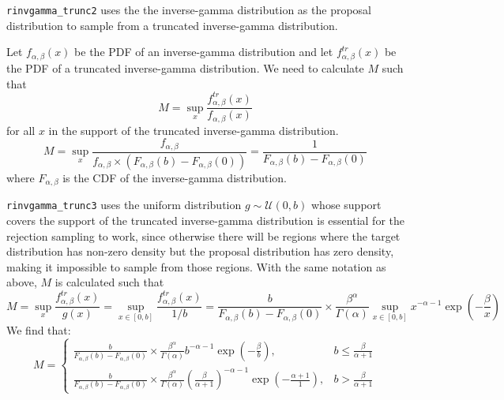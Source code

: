 \begin{answerenum}
    \item \texttt{rinvgamma\_trunc2} uses the the inverse-gamma distribution as the proposal distribution to sample from a truncated inverse-gamma distribution.

    Let \(f_{\alpha, \beta}(x)\) be the PDF of an inverse-gamma distribution and let \(f_{\alpha, \beta}^{tr}(x)\) be the PDF of a truncated inverse-gamma distribution.
    We need to calculate \(M\) such that
    \[ M = \sup_{x} \frac{f_{\alpha, \beta}^{tr}(x)}{f_{\alpha, \beta}(x)}\]
    for all \(x\) in the support of the truncated inverse-gamma distribution.
    \[ M = \sup_x \frac{f_{\alpha, \beta}}{f_{\alpha, \beta} \times (F_{\alpha, \beta}(b) - F_{\alpha, \beta}(0))} = \frac{1}{F_{\alpha, \beta}(b) - F_{\alpha, \beta}(0)} \]
    where \(F_{\alpha, \beta}\) is the CDF of the inverse-gamma distribution.

    \item \texttt{rinvgamma\_trunc3} uses the uniform distribution \(g \sim \mathcal{U}(0, b)\) whose support covers the support of the truncated inverse-gamma distribution is essential for the rejection sampling to work, since otherwise there will be regions where the target distribution has non-zero density but the proposal distribution has zero density, making it impossible to sample from those regions.
    With the same notation as above, \(M\) is calculated such that
    \[ M = \sup_{x} \frac{f_{\alpha, \beta}^{tr}(x)}{g(x)} = \sup_{x \in [0,b]} \frac{f_{\alpha, \beta}^{tr}(x)}{1/b} = \frac{b}{F_{\alpha, \beta}(b) - F_{\alpha, \beta}(0)} \times \frac{\beta^{\alpha}}{\Gamma(\alpha)} \sup_{x \in [0, b]} x^{-\alpha-1} \exp \left(-\frac{\beta}{x}\right) \]
    We find that:
    \[ M = \begin{cases}
        \frac{b}{F_{\alpha, \beta}(b) - F_{\alpha, \beta}(0)} \times \frac{\beta^{\alpha}}{\Gamma(\alpha)} b^{-\alpha-1} \exp \left(-\frac{\beta}{b}\right), & b \leq \frac{\beta}{\alpha + 1} \\[1em]
        \frac{b}{F_{\alpha, \beta}(b) - F_{\alpha, \beta}(0)} \times \frac{\beta^{\alpha}}{\Gamma(\alpha)} \left(\frac{\beta}{\alpha + 1}\right)^{-\alpha-1} \exp \left(-\frac{\alpha + 1}{1}\right), & b > \frac{\beta}{\alpha + 1}
    \end{cases} \]
\end{answerenum}